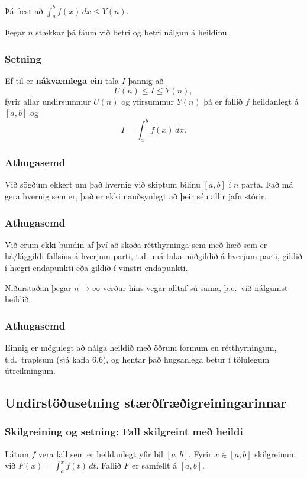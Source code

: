 \documentclass[icelandic,a4paper,12pt]{article}
\begin{document}
Þá fæst að $\int_a^b f(x)\, dx \leq Y(n)$. 

Þegar $n$ stækkar þá fáum við  betri og betri nálgun á heildinu.

\subsubsection{Setning}
Ef til er {\bf nákvæmlega ein} tala $I$ þannig að 
$$
U(n) \leq I \leq Y(n),
$$
fyrir allar undirsummur $U(n)$ og yfirsummur $Y(n)$ þá er fallið
$f$ heildanlegt á $[a,b]$  og 
$$
I = \int_a^b f(x)\, dx.
$$

\subsubsection{Athugasemd}
Við sögðum ekkert um það hvernig við skiptum bilinu $[a,b]$ í $n$ parta. 
Það má gera hvernig sem er, það er ekki nauðsynlegt að þeir séu allir jafn stórir.

\subsubsection{Athugasemd}
Við erum ekki bundin af því að skoða rétthyrninga sem með hæð sem er há/lággildi 
fallsins á hverjum parti, t.d.~má taka miðgildið á hverjum parti,
gildið í hægri endapunkti eða gildið í vinstri endapunkti. 

Niðurstaðan þegar $n\to \infty$ verður hins vegar alltaf sú sama, þ.e.~við nálgumst heildið.

\subsubsection{Athugasemd}
Einnig er mögulegt að nálga heildið með öðrum formum
en rétthyrningum, t.d.~trapisum (sjá kafla 6.6), og
hentar það hugsanlega betur í tölulegum útreikningum.

\subsection{Undirstöðusetning stærðfræðigreiningarinnar}
\subsubsection{Skilgreining og setning: Fall skilgreint með heildi}
Látum $f$ vera fall sem er heildanlegt yfir bil $[a, b]$. 
Fyrir $x\in[a, b]$ skilgreinum við $F(x)=\int_a^x f(t)\,dt$.  Fallið $F$ er
samfellt á $[a, b]$.
\end{document}
